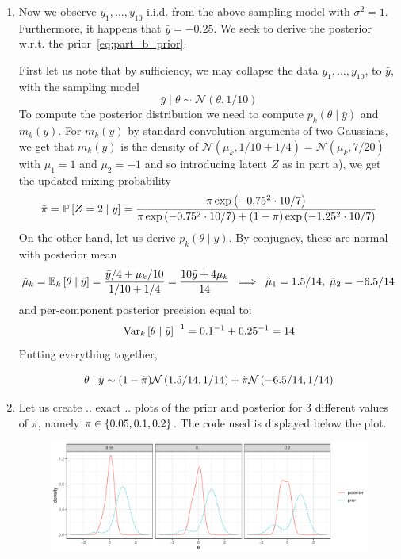 \begin{enumerate}[label=(\alph*)]
\item  Now we observe $y_1,\dots,y_{10}$ i.i.d. from the above sampling model with $\sigma^2=1$. Furthermore, it happens that $\bar{y}=-0.25$. We seek to derive the posterior w.r.t. the prior~\eqref{eq:part_b_prior}.

First let us note that by sufficiency, we may collapse the data $y_1,\dots,y_{10}$, to $\bar{y}$, with the sampling model
$$\bar{y} \mid \theta \sim \mathcal{N}(\theta, 1/10)$$
To compute the posterior distribution we need to compute $p_k(\theta \mid \bar{y})$ and $m_k(y)$. For $m_k(y)$ by standard convolution arguments of two Gaussians, we get that $m_k(y)$ is the density of $\mathcal{N}(\mu_k, 1/10 + 1/4) = \mathcal{N}(\mu_k, 7/20)$ with $\mu_1=1$ and $\mu_2 = -1$ and so introducing latent $Z$ as in part a), we get the updated mixing probability
$$\tilde{\pi} = \PP{Z=2 \mid y} = \frac{\pi \exp\p{-0.75^2 \cdot 10/7}}{\pi \exp\p{-0.75^2 \cdot 10/7} + (1-\pi) \exp\p{-1.25^2 \cdot 10/7}} $$
On the other hand, let us derive $p_k(\theta \mid y)$. By conjugacy, these are normal with posterior mean
$$ \tilde{\mu}_k = \EE[k]{\theta \mid \bar{y}} = \frac{\bar{y}/4 + \mu_k/10}{1/10 + 1/4} = \frac{10\bar{y} + 4\mu_k}{14}\;\; \Longrightarrow \;\;\tilde{\mu}_1 = 1.5/14,\;\tilde{\mu}_2 = -6.5/14$$
and per-component posterior precision equal to:
$$ \Var[k]{\theta \mid \bar{y}}^{-1} = 0.1^{-1} + 0.25^{-1} = 14$$
Putting everything together,

\begin{equation}
\label{eq:bary_posterior}
\theta \mid \bar{y} \sim (1-\tilde{\pi}) \mathcal{N}\p{1.5/14, 1/14} +  \tilde{\pi} \mathcal{N}\p{-6.5/14, 1/14}
\end{equation}

\item Let us create .. exact .. plots of the prior and posterior for 3 different values of $\pi$, namely $\pi \in \cb{0.05, 0.1, 0.2}$. The code used is displayed below the plot.

\begin{figure}[H]
\includegraphics[width=1.15\linewidth]{figures/normal_mixture_prior_posterior.pdf}
\end{figure}


\end{enumerate}
